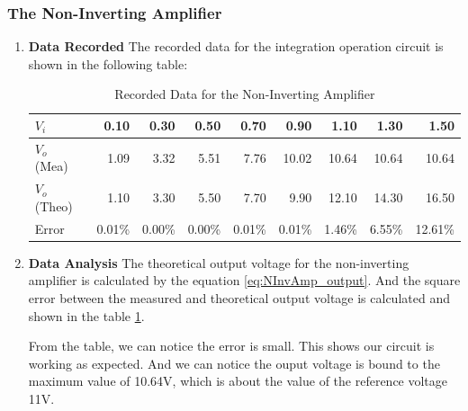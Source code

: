     \subsubsection{The Non-Inverting Amplifier}
    \begin{enumerate}[I]
        \item \textbf{Data Recorded}\newline
            The recorded data for the integration operation circuit is shown in the following table:
            \begin{table}[H]
                \centering
                \begin{tabular}{l|rrrrrrrr}
                    \toprule
                    $V_i$ & 0.10  & 0.30  & 0.50  & 0.70  & 0.90  & 1.10  & 1.30  & 1.50 \\
                    \midrule
                    $V_o$ (Mea) & 1.09  & 3.32  & 5.51  & 7.76  & 10.02 & 10.64 & 10.64 & 10.64 \\
                    \midrule
                    $V_o$ (Theo) & 1.10  & 3.30  & 5.50  & 7.70  & 9.90  & 12.10 & 14.30 & 16.50 \\
                    Error & 0.01\% & 0.00\% & 0.00\% & 0.01\% & 0.01\% & 1.46\% & 6.55\% & 12.61\% \\
                    \bottomrule
                    \end{tabular}%
                    \caption{Recorded Data for the Non-Inverting Amplifier}
                    \label{tab:NInvAmp}
            \end{table}
        \item \textbf{Data Analysis}\newline
            The theoretical output voltage for the non-inverting amplifier is calculated by the equation \ref{eq:NInvAmp_output}. And the square error between the measured and theoretical output voltage is calculated and shown in the table \ref{tab:NInvAmp}.\par

            From the table, we can notice the error is small. This shows our circuit is working as expected. And we can notice the ouput voltage is bound to the maximum value of 10.64V, which is about the value of the reference voltage 11V.\par
    \end{enumerate}

